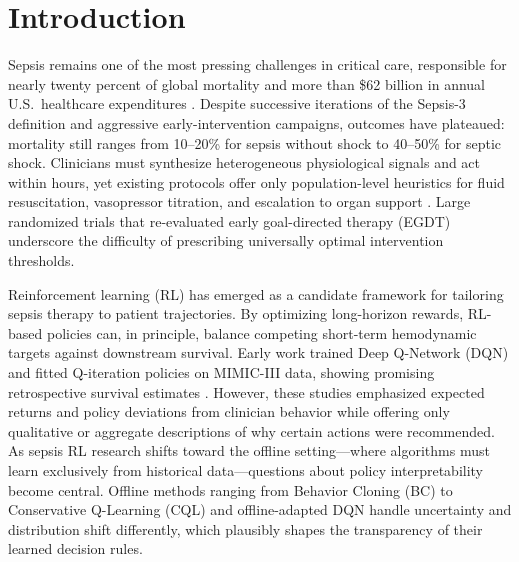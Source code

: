 
\section{Introduction}\label{sec:intro}

Sepsis remains one of the most pressing challenges in critical care, responsible for nearly twenty percent of global mortality and more than \$62 billion in annual U.S.\ healthcare expenditures \citep{rudd2020sepsis, fleischmann2016sepsis}. Despite successive iterations of the Sepsis-3 definition \citep{singer2016sepsis3} and aggressive early-intervention campaigns, outcomes have plateaued: mortality still ranges from 10--20\% for sepsis without shock to 40--50\% for septic shock. Clinicians must synthesize heterogeneous physiological signals and act within hours, yet existing protocols offer only population-level heuristics for fluid resuscitation, vasopressor titration, and escalation to organ support \citep{rhodes2017ssc}. Large randomized trials that re-evaluated early goal-directed therapy (EGDT) \citep{rivers2001egdt, arise2014} underscore the difficulty of prescribing universally optimal intervention thresholds.

Reinforcement learning (RL) has emerged as a candidate framework for tailoring sepsis therapy to patient trajectories. By optimizing long-horizon rewards, RL-based policies can, in principle, balance competing short-term hemodynamic targets against downstream survival. Early work trained Deep Q-Network (DQN) and fitted Q-iteration policies on MIMIC-III data, showing promising retrospective survival estimates \citep{raghu2017sepsis_drl, komorowski2018ai_clinician}. However, these studies emphasized expected returns and policy deviations from clinician behavior while offering only qualitative or aggregate descriptions of why certain actions were recommended. As sepsis RL research shifts toward the offline setting—where algorithms must learn exclusively from historical data—questions about policy interpretability become central. Offline methods ranging from Behavior Cloning (BC) to Conservative Q-Learning (CQL) and offline-adapted DQN handle uncertainty and distribution shift differently, which plausibly shapes the transparency of their learned decision rules.

